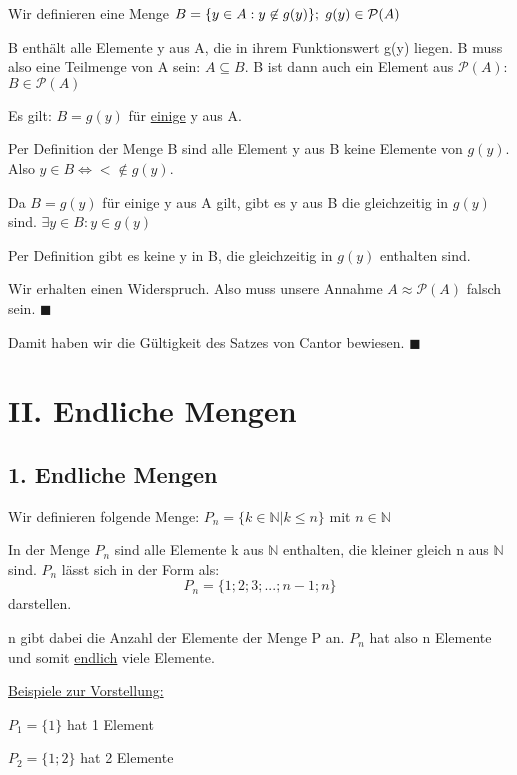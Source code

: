 \documentclass[12pt]{article}
\begin{document}
		Wir definieren eine Menge $B = \{y \in A: y \not \in g(y)\}; \hspace*{1mm} g(y) \in \mathcal{P}(A)$
		
		
		B enthält alle Elemente y aus A, die in ihrem Funktionswert g(y) liegen.
		B muss also eine Teilmenge von A sein: $A \subseteq B$.
		B ist dann auch ein Element aus $\mathcal{P}(A)$: $B \in \mathcal{P}(A)$
		
		Es gilt: $B = g(y)$ für \underline{einige} y aus A.
		
		Per Definition der Menge B sind alle Element y aus B keine Elemente von $g(y)$.
		Also $y \in B \Leftrightarrow < \not \in g(y)$.
		
		Da $B = g(y)$ für einige y aus A gilt, gibt es y aus B die gleichzeitig in $g(y)$ sind.
		$\exists y \in B: y \in g(y)$
		
		Per Definition gibt es keine y in B, die gleichzeitig in $g(y)$ enthalten sind.
		
		Wir erhalten einen Widerspruch.
		Also muss unsere Annahme $A \approx \mathcal{P}(A)$ falsch sein.
		$\blacksquare$
		
		Damit haben wir die Gültigkeit des Satzes von Cantor bewiesen.
		$\blacksquare$
		
		\section*{II. Endliche Mengen}
		
		\subsection*{1. Endliche Mengen}
		
		Wir definieren folgende Menge: $P_n = \{k \in \mathbb{N} | k \le n\}$ mit $n \in \mathbb{N}$
		
		In der Menge $P_n$ sind alle Elemente k aus $\mathbb{N}$ enthalten, die kleiner gleich n aus
		$\mathbb{N}$ sind. $P_n$ lässt sich in der Form als:
		\[
			P_n = \{1;2;3;...;n-1;n\}
		\]
		darstellen.
		
		n gibt dabei die Anzahl der Elemente der Menge P an. $P_n$ hat also n Elemente und somit 
		\underline{endlich} viele Elemente.
		
		\underline{Beispiele zur Vorstellung:}
		
		$P_1 = \{1\}$ hat 1 Element
		
		$P_2 = \{1; 2\}$ hat 2 Elemente
		
\end{document}
